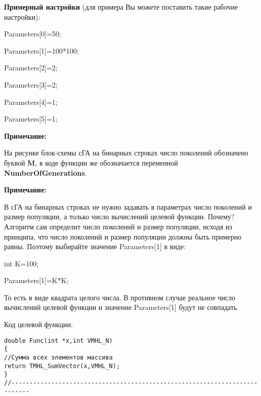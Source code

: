 \documentclass[a4paper,12pt]{article}
\begin{document}
\textbf{Примерный настройки} (для примера Вы можете поставить такие рабочие настройки):

 Parameters[0]=50;
 
Parameters[1]=100*100;

Parameters[2]=2;

Parameters[3]=2;

Parameters[4]=1;

Parameters[5]=1;


\textbf{Примечание:}

 На рисунке блок-схемы сГА на бинарных строках число поколений обозначено буквой \textbf{M}, в коде функции же обозначается переменной \textbf{NumberOfGenerations}.


\textbf{Примечание:}

 В сГА на бинарных строках не нужно задавать в параметрах число поколений и размер популяции, а только число вычислений целевой функции. Почему? Алгоритм сам определит число поколений и размер популяции, исходя из принципа, что число поколений и размер популяции должны быть примерно равны. Поэтому выбирайте значение Parameters[1] в виде:

int K=100;

Parameters[1]=K*K;

То есть в виде квадрата целого числа. В противном случае реальное число вычислений целевой функции и значение Parameters[1] будут не совпадать.

Код целевой функции:
\begin{lstlisting}[caption=Оптимизируемая функция]
double Func(int *x,int VMHL_N)
{
//Сумма всех элементов массива
return TMHL_SumVector(x,VMHL_N);
}
//---------------------------------------------------------------------------
\end{lstlisting}
\end{document}
